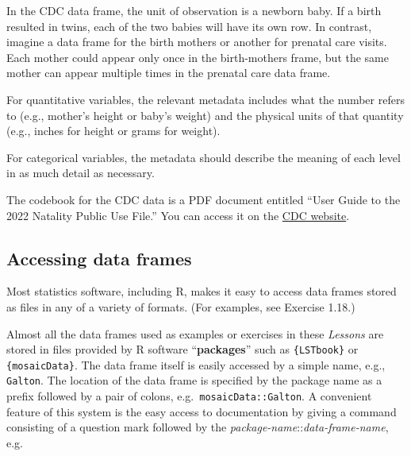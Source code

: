\documentclass[
  letterpaper,
  DIV=11,
  numbers=noendperiod,
  oneside]{scrartcl}
\begin{document}
In the CDC data frame, the unit of observation is a newborn baby. If a
birth resulted in twins, each of the two babies will have its own row.
In contrast, imagine a data frame for the birth mothers or another for
prenatal care visits. Each mother could appear only once in the
birth-mothers frame, but the same mother can appear multiple times in
the prenatal care data frame.

For quantitative variables, the relevant metadata includes what the
number refers to (e.g., mother's height or baby's weight) and the
physical units of that quantity (e.g., inches for height or grams for
weight).

For categorical variables, the metadata should describe the meaning of
each level in as much detail as necessary.

\begin{tcolorbox}[enhanced jigsaw, colbacktitle=quarto-callout-note-color!10!white, opacityback=0, breakable, opacitybacktitle=0.6, colback=white, coltitle=black, arc=.35mm, title=\textcolor{quarto-callout-note-color}{\faInfo}\hspace{0.5em}{Example (cont.): CDC births codebook}, left=2mm, colframe=quarto-callout-note-color-frame, rightrule=.15mm, bottomrule=.15mm, leftrule=.75mm, bottomtitle=1mm, toptitle=1mm, titlerule=0mm, toprule=.15mm]

The codebook for the CDC data is a PDF document entitled ``User Guide to
the 2022 Natality Public Use File.'' You can access it on the
\href{https://ftp.cdc.gov/pub/Health_Statistics/NCHS/Dataset_Documentation/DVS/natality/UserGuide2022.pdf}{CDC
website}.

\end{tcolorbox}

\subsection{Accessing data frames}\label{accessing-data-frames}

Most statistics software, including R, makes it easy to access data
frames stored as files in any of a variety of formats. (For examples,
see Exercise 1.18.)

Almost all the data frames used as examples or exercises in these
\emph{Lessons} are stored in files provided by R software
``\textbf{packages}'' such as \texttt{\{LSTbook\}} or
\texttt{\{mosaicData\}}. The data frame itself is easily accessed by a
simple name, e.g., \texttt{Galton}. The location of the data frame is
specified by the package name as a prefix followed by a pair of colons,
e.g.~\texttt{mosaicData::Galton}. A convenient feature of this system is
the easy access to documentation by giving a command consisting of a
question mark followed by the
\emph{package-name}::\emph{data-frame-name}, e.g.
\end{document}
